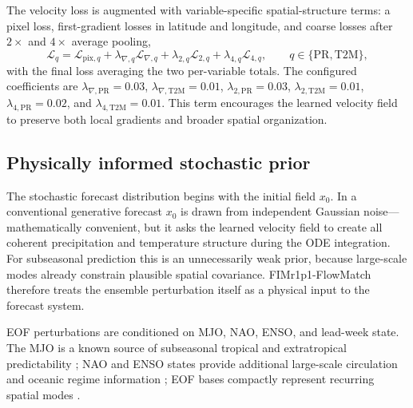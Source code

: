 \documentclass[11pt]{article}
\newcommand{\modelshort}{FIMr1p1}
\newcommand{\methodname}{\modelshort{}-FlowMatch}
\begin{document}
The velocity loss is augmented with variable-specific spatial-structure terms: a pixel loss, first-gradient losses in latitude and longitude, and coarse losses after $2\times$ and $4\times$ average pooling,
\begin{equation}
  \mathcal{L}_{q} =
  \mathcal{L}_{\mathrm{pix},q}
  + \lambda_{\nabla,q}\mathcal{L}_{\nabla,q}
  + \lambda_{2,q}\mathcal{L}_{2,q}
  + \lambda_{4,q}\mathcal{L}_{4,q},
  \qquad q\in\{\mathrm{PR},\mathrm{T2M}\},
\end{equation}
with the final loss averaging the two per-variable totals. The configured coefficients are $\lambda_{\nabla,\mathrm{PR}}=0.03$, $\lambda_{\nabla,\mathrm{T2M}}=0.01$, $\lambda_{2,\mathrm{PR}}=0.03$, $\lambda_{2,\mathrm{T2M}}=0.01$, $\lambda_{4,\mathrm{PR}}=0.02$, and $\lambda_{4,\mathrm{T2M}}=0.01$. This term encourages the learned velocity field to preserve both local gradients and broader spatial organization.

\subsection{Physically informed stochastic prior}
\label{sec:method-prior}

The stochastic forecast distribution begins with the initial field $x_0$. In a conventional generative forecast $x_0$ is drawn from independent Gaussian noise---mathematically convenient, but it asks the learned velocity field to create all coherent precipitation and temperature structure during the ODE integration. For subseasonal prediction this is an unnecessarily weak prior, because large-scale modes already constrain plausible spatial covariance. \methodname{} therefore treats the ensemble perturbation itself as a physical input to the forecast system.

EOF perturbations are conditioned on MJO, NAO, ENSO, and lead-week state. The MJO is a known source of subseasonal tropical and extratropical predictability \citep{MaddenJulian1971,WheelerHendon2004}; NAO and ENSO states provide additional large-scale circulation and oceanic regime information \citep{WallaceGutzler1981,BarnstonLivezey1987}; EOF bases compactly represent recurring spatial modes \citep{Lorenz1956}.
\end{document}

